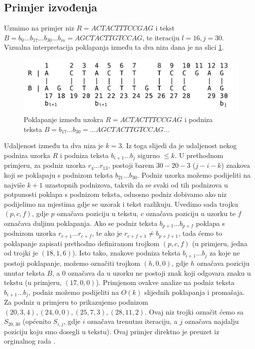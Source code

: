 \documentclass[times, utf8, zavrsni]{fer}
\begin{document}
\subsection{Primjer izvođenja} \label{primjer}
\begin{sloppypar}
Uzmimo na primjer niz $R = ACTACTTTCCGAG$ i tekst $B = b_{0}\dots b_{17}\dots b_{30} \dots b_{m} = AGCTACTTGTCCAG$, te iteraciju $l=16, j=30$. Vizualna interpretacija poklapanja između ta dva niza dana je na slici \ref{fig:infixExample}.
\end{sloppypar}
\begin{figure}[ht!]
\centering
\includegraphics[width=120mm]{InfixExample.jpeg}
\caption{Poklapanje između uzokra $R = ACTACTTTCCGAG$ i podniza teksta $B = b_{17}\dots b_{30} = \dots AGCTACTTGTCCAG \dots$}\label{fig:infixExample}
\end{figure}

Udaljenost između ta dva niza je $k=3$. Iz toga slijedi da je udaljenost nekog podniza uzorka $R$ i podniza teksta $b_{i+1}\dots b_{j}$ sigurno $\leq k$. U prethodnom primjeru, za podniz uzorka $r_{4}\dots r_{13}$, postoji barem $30-20-3$ ($j-i-k$) znakova koji se poklapaju s podnizom teksta $b_{21}\dots b_{30}$. Podniz uzorka možemo podijeliti na najviše $k+1$ uzastopnih podnizova, takvih da se svaki od tih podnizova u potpunosti poklapa s podnizom teksta, odnosno podniz dobivamo ako niz podijelimo na mjestima gdje se uzorak i tekst razlikuju. Uvedimo sada trojku $(p,c,f)$, gdje $p$ označava poziciju u tekstu, $c$ označava poziciju u uzorku te $f$ označava duljinu poklapanja. Ako se podniz teksta $b_{p+1}\dots b_{p+f}$ poklapa s podnizom uzorka $r_{c+1}\dots r_{c+f}$, te ako je $r_{c+f+1}\neq b_{p+f+1}$, tada ćemo to poklapanje zapisati prethodno definiranom trojkom $(p,c,f)$ (u primjeru, jedna od trojki je $(18,1,6)$). Isto tako, znakove podniza teksta $b_{i+1}\dots b_{j}$ za koje ne postoji poklapanje, možemo označiti trojkom $(h,0,0)$, gdje $h$ označava poziciju unutar teksta $B$, a $0$ označava da u uzorku ne postoji znak koji odgovara znaku u tekstu (u primjeru, $(17,0,0)$). Primjenom ovakve analize na podniz teksta $b_{i+1}\dots b_{j}$, podniz možemo podijeliti na $O(k)$ slijednih poklapanja i promašaja. Za podniz u primjeru to prikazujemo podnizom $(20,3,4),(24,0,0),(25,7,3),(28,11,2)$. Ovaj niz trojki označit ćemo sa $S_{20,30}$ (općenito $S_{i,j}$, gdje $i$ označava trenutnu iteraciju, a $j$ označava najdalju poziciju koju smo dosegli u tekstu). Ovaj primjer direktno je preuzet iz orginalnog rada \cite{Landau1986}.
\end{document}
